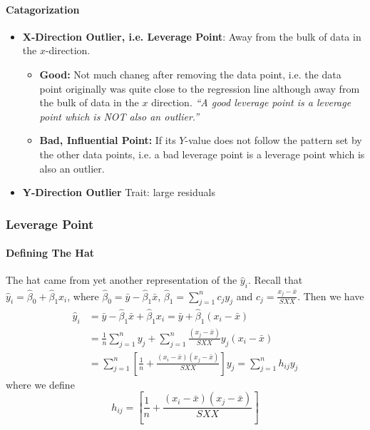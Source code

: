 \documentclass[11pt]{article}
\begin{document}
\paragraph{Catagorization}
\begin{itemize}
    \item \textbf{X-Direction Outlier, i.e. Leverage Point}: Away from the bulk of data in the $x$-direction. 
    \begin{itemize}
        \item \textbf{Good:} Not much chaneg after removing the data point, i.e. the data point originally was quite close to the regression line although away from the bulk of data in the $x$ direction. \textit{``A good leverage point is a leverage point which is NOT also an outlier.''}
        \item \textbf{Bad, Influential Point:} If its $Y$-value does not follow the pattern set by the other data points, i.e. a bad leverage point is a leverage point which is also an outlier. 
    \end{itemize}
    \item \textbf{Y-Direction Outlier} Trait: large residuals
\end{itemize}

\subsubsection{Leverage Point}
\paragraph{Defining The Hat}
The hat came from yet another representation of the $\hat{y}_i$. Recall that $\hat{y}_{i}=\hat{\beta}_{0}+\hat{\beta}_{1} x_{i}$, where $\hat{\beta}_{0}=\bar{y}-\hat{\beta}_{1} \bar{x}$, $\hat{\beta}_{1}=\sum_{j=1}^{n} c_{j} y_{j}$ and $c_{j}=\frac{x_{j}-\bar{x}}{S X X}$.
Then we have
\begin{align*}
    \hat{y}_{i}
    &=\bar{y}-\hat{\beta}_{1} \bar{x}+\hat{\beta}_{1} x_{i} 
    =\bar{y}+\hat{\beta}_{1}\left(x_{i}-\bar{x}\right) \\
    &=\frac{1}{n} \sum_{j=1}^{n} y_{j}+\sum_{j=1}^{n} \frac{\left(x_{j}-\bar{x}\right)}{S X X} y_{j}\left(x_{i}-\bar{x}\right) \\
    &=\sum_{j=1}^{n}\left[\frac{1}{n}+\frac{\left(x_{i}-\bar{x}\right)\left(x_{j}-\bar{x}\right)}{S X X}\right] y_{j} 
    =\sum_{j=1}^{n} h_{i j} y_{j}
\end{align*}
where we define
\begin{equation*}
    h_{i j}=\left[\frac{1}{n}+\frac{\left(x_{i}-\bar{x}\right)\left(x_{j}-\bar{x}\right)}{S X X}\right]
\end{equation*}
\end{document}
